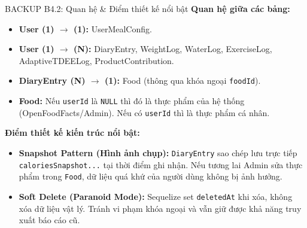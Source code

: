 \documentclass[10pt, aspectratio=169]{beamer}
\begin{document}
\begin{frame}[label=b4_2]{BACKUP B4.2: Quan hệ \& Điểm thiết kế nổi bật}
\hypertarget{b4_2_target}{}
    \textbf{Quan hệ giữa các bảng:}
    \begin{itemize}
        \item \textbf{User (1) $\rightarrow$ (1):} UserMealConfig.
        \item \textbf{User (1) $\rightarrow$ (N):} DiaryEntry, WeightLog, WaterLog, ExerciseLog, AdaptiveTDEELog, ProductContribution.
        \item \textbf{DiaryEntry (N) $\rightarrow$ (1):} Food (thông qua khóa ngoại \texttt{foodId}).
        \item \textbf{Food:} Nếu \texttt{userId} là \texttt{NULL} thì đó là thực phẩm của hệ thống (OpenFoodFacts/Admin). Nếu có \texttt{userId} thì là thực phẩm cá nhân.
    \end{itemize}
    
    \vspace{0.3cm}
    \textbf{Điểm thiết kế kiến trúc nổi bật:}
    \begin{itemize}
        \item \textbf{Snapshot Pattern (Hình ảnh chụp):} \texttt{DiaryEntry} sao chép lưu trực tiếp \texttt{caloriesSnapshot...} tại thời điểm ghi nhận. Nếu tương lai Admin sửa thực phẩm trong \texttt{Food}, dữ liệu quá khứ của người dùng không bị ảnh hưởng.
        \item \textbf{Soft Delete (Paranoid Mode):} Sequelize set \texttt{deletedAt} khi xóa, không xóa dữ liệu vật lý. Tránh vi phạm khóa ngoại và vẫn giữ được khả năng truy xuất báo cáo cũ.
    \end{itemize}
\end{frame}
\end{document}
